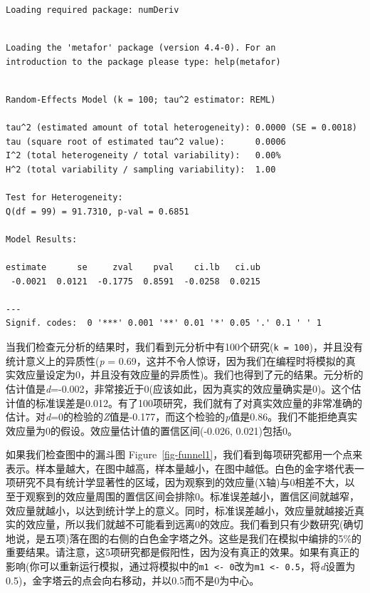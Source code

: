 \documentclass[
  letterpaper,
  DIV=11,
  numbers=noendperiod]{scrreprt}
\begin{document}
\begin{verbatim}
Loading required package: numDeriv
\end{verbatim}

\begin{verbatim}

Loading the 'metafor' package (version 4.4-0). For an
introduction to the package please type: help(metafor)
\end{verbatim}

\begin{verbatim}

Random-Effects Model (k = 100; tau^2 estimator: REML)

tau^2 (estimated amount of total heterogeneity): 0.0000 (SE = 0.0018)
tau (square root of estimated tau^2 value):      0.0006
I^2 (total heterogeneity / total variability):   0.00%
H^2 (total variability / sampling variability):  1.00

Test for Heterogeneity:
Q(df = 99) = 91.7310, p-val = 0.6851

Model Results:

estimate      se     zval    pval    ci.lb   ci.ub    
 -0.0021  0.0121  -0.1775  0.8591  -0.0258  0.0215    

---
Signif. codes:  0 '***' 0.001 '**' 0.01 '*' 0.05 '.' 0.1 ' ' 1
\end{verbatim}

当我们检查元分析的结果时，我们看到元分析中有100个研究(\texttt{k\ =\ 100})，并且没有统计意义上的异质性(\emph{p}
=
0.69，这并不令人惊讶，因为我们在编程时将模拟的真实效应量设定为0，并且没有效应量的异质性)。我们也得到了元的结果。元分析的估计值是\emph{d}=-0.002，非常接近于0(应该如此，因为真实的效应量确实是0)。这个估计值的标准误差是0.012。有了100项研究，我们就有了对真实效应量的非常准确的估计。对\emph{d}=0的检验的\emph{Z}值是-0.177，而这个检验的\emph{p}值是0.86。我们不能拒绝真实效应量为0的假设。效应量估计值的置信区间(-0.026,
0.021)包括0。

如果我们检查图中的漏斗图
Figure~\ref{fig-funnel1}，我们看到每项研究都用一个点来表示。样本量越大，在图中越高，样本量越小，在图中越低。白色的金字塔代表一项研究不具有统计学显著性的区域，因为观察到的效应量(X轴)与0相差不大，以至于观察到的效应量周围的置信区间会排除0。标准误差越小，置信区间就越窄，效应量就越小，以达到统计学上的意义。同时，标准误差越小，效应量就越接近真实的效应量，所以我们就越不可能看到远离0的效应。我们看到只有少数研究(确切地说，是五项)落在图的右侧的白色金字塔之外。这些是我们在模拟中编排的5\%的重要结果。请注意，这5项研究都是假阳性，因为没有真正的效果。如果有真正的影响(你可以重新运行模拟，通过将模拟中的\texttt{m1\ \textless{}-\ 0}改为\texttt{m1\ \textless{}-\ 0.5}，将\emph{d}设置为0.5)，金字塔云的点会向右移动，并以0.5而不是0为中心。
\end{document}
